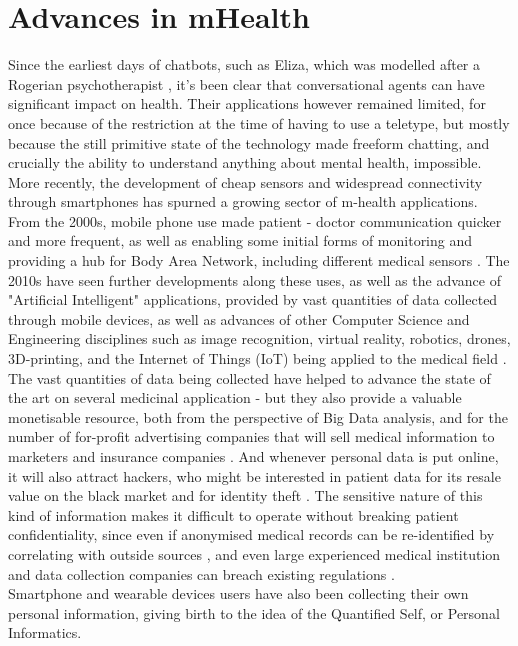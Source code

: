 \section{Advances in mHealth}
Since the earliest days of chatbots, such as Eliza, which was modelled after a Rogerian psychotherapist \cite{weizenbaum1966eliza}, it's been clear that conversational agents can have significant impact on health. Their applications however remained limited, for once because of the restriction at the time of having to use a teletype, but mostly because the still primitive state of the technology made freeform chatting, and crucially the ability to understand anything about mental health, impossible. More recently, the development of cheap sensors and widespread connectivity through smartphones has spurned a growing sector of m-health applications. From the 2000s, mobile phone use made patient - doctor communication quicker and more frequent, as well as enabling some initial forms of monitoring and providing a hub for Body Area Network, including different medical sensors \cite{Patrick2008}. The 2010s have seen further developments along these uses, as well as the advance of "Artificial Intelligent" applications, provided by vast quantities of data collected through mobile devices, as well as advances of other Computer Science and Engineering disciplines such as image recognition, virtual reality, robotics, drones, 3D-printing, and the Internet of Things (IoT) being applied to the medical field \cite{Pistorius2017}. The vast quantities of data being collected have helped to advance the state of the art on several medicinal application - but they also provide a valuable monetisable resource, both from the perspective of Big Data analysis, and for the number of for-profit advertising companies that will sell medical information to marketers and insurance companies \cite{tanner2016}. And whenever personal data is put online, it will also attract hackers, who might be interested in patient data for its resale value on the black market and for identity theft \cite{hackercare}. The sensitive nature of this kind of information makes it difficult to operate without breaking patient confidentiality, since even if anonymised medical records can be re-identified by correlating with outside sources \cite{Sweeney2001}, and even large experienced medical institution and data collection companies can breach existing regulations \cite{deepmindnhs}. \\
Smartphone and wearable devices users have also been collecting their own personal information, giving birth to the idea of the Quantified Self, or Personal Informatics. 

